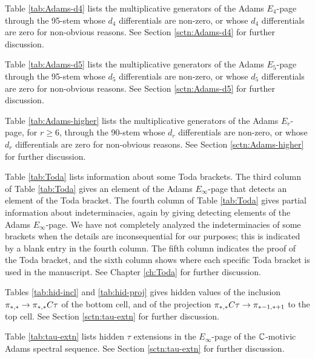 Table \ref{tab:Adams-d4} lists the multiplicative generators 
of the Adams $E_4$-page through the 95-stem
whose $d_4$ differentials are non-zero, or whose $d_4$ differentials
are zero for non-obvious reasons.
See Section \ref{sctn:Adams-d4} for further discussion.

Table \ref{tab:Adams-d5} lists the multiplicative generators 
of the Adams $E_5$-page through the 95-stem
whose $d_5$ differentials are non-zero, or whose $d_5$ differentials
are zero for non-obvious reasons.
See Section \ref{sctn:Adams-d5} for further discussion.

Table \ref{tab:Adams-higher} lists the multiplicative generators 
of the Adams $E_r$-page, for $r \geq 6$, through the 90-stem
whose $d_r$ differentials are non-zero, or whose $d_r$ differentials
are zero for non-obvious reasons.
See Section \ref{sctn:Adams-higher} for further discussion.

Table \ref{tab:Toda} lists information about some Toda brackets.
The third column of Table \ref{tab:Toda} gives an element of the
Adams $E_\infty$-page that detects an element of the Toda bracket.
The fourth column of Table \ref{tab:Toda} gives partial
information about indeterminacies, again by giving detecting elements
of the Adams $E_\infty$-page.  We have not completely analyzed the
indeterminacies of some brackets when the details are inconsequential
for our purposes; this is indicated by a blank entry in the fourth 
column.  The fifth column indicates the proof of 
the Toda bracket, and the sixth column shows where each specific
Toda bracket is used in the manuscript.
See Chapter \ref{ch:Toda} for further discussion.

Tables \ref{tab:hid-incl} and \ref{tab:hid-proj} gives
hidden values of the inclusion $\pi_{*,*} \rightarrow \pi_{*,*} C\tau$ of the
bottom cell, and of the projection $\pi_{*,*} C\tau \rightarrow \pi_{*-1,*+1}$
to the top cell.
See Section \ref{sctn:tau-extn} for further discussion.


Table \ref{tab:tau-extn} lists hidden $\tau$ extensions in the
$E_\infty$-page of the $\mathbb{C}$-motivic Adams spectral sequence.
See Section \ref{sctn:tau-extn} for further discussion.

